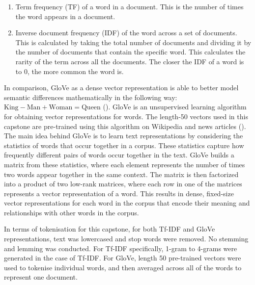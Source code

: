 \begin{enumerate}
	\item Term frequency (TF) of a word in a document. This is the number of times the word appears in a document.
	\item Inverse document frequency (IDF) of the word across a set of documents. This is calculated by taking the total number of documents and dividing it by the number of documents that contain the specific word. This calculates the rarity of the term across all the documents. The closer the IDF of a word is to 0, the more common the word is.
\end{enumerate}

In comparison, GloVe as a dense vector representation is able to better model semantic differences mathematically in the following way: $\text{King} - \text{Man} + \text{Woman} = \text{Queen}$ (\cite{vector_differences_2015}). GloVe is an unsupervised learning algorithm for obtaining vector representations for words. The length-50 vectors used in this capstone are pre-trained using this algorithm on Wikipedia and news articles (\cite{pennington2014glove}). The main idea behind GloVe is to learn text representations by considering the statistics of words that occur together in a corpus. These statistics capture how frequently different pairs of words occur together in the text. GloVe builds a matrix from these statistics, where each element represents the number of times two words appear together in the same context. The matrix is then factorized into a product of two low-rank matrices, where each row in one of the matrices represents a vector representation of a word. This results in dense, fixed-size vector representations for each word in the corpus that encode their meaning and relationships with other words in the corpus.

In terms of tokenisation for this capstone, for both Tf-IDF and GloVe representations, text was lowercased and stop words were removed. No stemming and lemming was conducted. For Tf-IDF specifically, 1-gram to 4-grams were generated in the case of Tf-IDF. For GloVe, length 50 pre-trained vectors were used to tokenise individual words, and then averaged across all of the words to represent one document.

